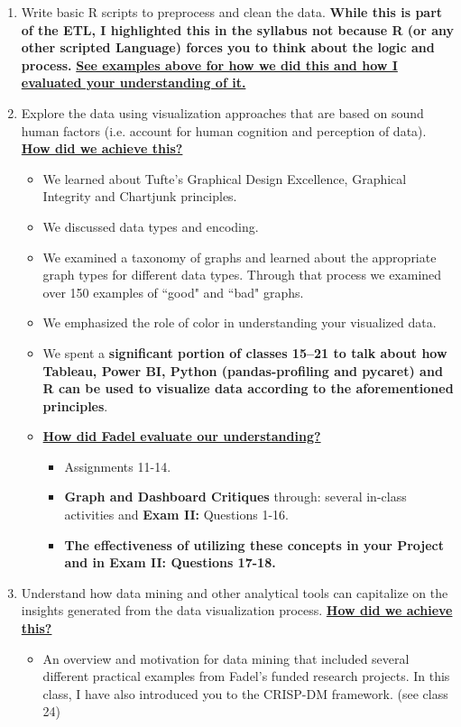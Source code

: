 \documentclass[letterpaper,12pt]{article}
\begin{document}
\begin{enumerate}[label=(\Alph*)]
\begin{itemize}[nosep]
	\end{itemize}
	\item Write basic R scripts to preprocess and clean the data. \textbf{While this is part of the ETL, I highlighted this in the syllabus not because \textbf{\textbf{R}} (or any other scripted Language) forces you to think about the logic and process.} \textbf{\ul{See examples above for how we did this and how I evaluated your understanding of it.}}
	\item Explore the data using visualization approaches that are based on sound human factors (i.e. account for human cognition and perception of data). \textbf{\ul{How did we achieve this?}}
	\begin{itemize}[nosep]
		\item We learned about Tufte's Graphical Design Excellence, Graphical Integrity and Chartjunk principles.
		\item We discussed data types and encoding. 
		\item We examined a taxonomy of graphs and learned about the appropriate graph types for different data types. Through that process we examined over 150 examples of ``good" and ``bad" graphs.
		\item We emphasized the role of color in understanding your visualized data. 
		\item We spent a \textbf{significant portion of classes 15--21 to talk about how Tableau, Power BI, Python (pandas-profiling and pycaret) and R can be used to visualize data according to the aforementioned principles}.
		\item \textbf{\ul{How did Fadel evaluate our understanding?}}
		\begin{itemize}
			\item Assignments 11-14.
			\item \textbf{Graph and Dashboard Critiques} through: several in-class activities and  \textbf{Exam II:} Questions 1-16.
			\item \textbf{The effectiveness of utilizing these concepts in your Project and in Exam II: Questions 17-18.}
		\end{itemize}
	\end{itemize}
	\item Understand how data mining and other analytical tools can capitalize on the insights generated from the data visualization process. \textbf{\ul{How did we achieve this?}}
	\begin{itemize}[nosep]
		\item An overview and motivation for data mining that included several different practical examples from Fadel's funded research projects. In this class, I have also introduced you to the CRISP-DM framework. (see class 24)

\end{itemize}
\end{enumerate}
\end{document}
